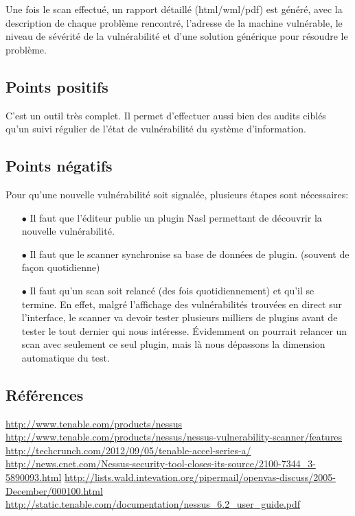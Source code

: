 Une fois le scan effectué, un rapport détaillé (html/wml/pdf) est généré, avec la description de chaque problème rencontré, l’adresse de la machine vulnérable, le niveau de sévérité de la vulnérabilité et d’une solution générique pour résoudre le problème.


\subsection{Points positifs}
C’est un outil très complet. Il permet d'effectuer aussi bien des audits ciblés qu’un suivi régulier de l’état de vulnérabilité du système d’information.

\subsection{Points négatifs}
Pour qu’une nouvelle vulnérabilité soit signalée, plusieurs étapes sont nécessaires:\\
\begin{itemize}
\item [$\bullet$]Il faut que l’éditeur publie un plugin Nasl permettant de découvrir la nouvelle vulnérabilité.\\
\item [$\bullet$]Il faut que le scanner synchronise sa base de données de plugin. (souvent de façon quotidienne)\\
\item [$\bullet$]Il faut qu’un scan soit relancé (des fois quotidiennement) et qu’il se termine. En effet, malgré l’affichage des vulnérabilités trouvées en direct sur l’interface, le scanner va devoir tester plusieurs milliers de plugins avant de tester le tout dernier qui nous intéresse. Évidemment on pourrait relancer un scan avec seulement ce seul plugin, mais là nous dépassons la dimension automatique du test.
\end{itemize}

\subsection{Références}
\small
\noindent
 [1] \url{http://www.tenable.com/products/nessus} \newline
 [2] \url{http://www.tenable.com/products/nessus/nessus-vulnerability-scanner/features} \newline
 [3] \url{http://techcrunch.com/2012/09/05/tenable-accel-series-a/} \newline
 [3] \url{http://news.cnet.com/Nessus-security-tool-closes-its-source/2100-7344_3-5890093.html} \newline
 [5] \url{http://lists.wald.intevation.org/pipermail/openvas-discuss/2005-December/000100.html} \newline
 [6] \url{http://static.tenable.com/documentation/nessus_6.2_user_guide.pdf} \newline
\normalsize
